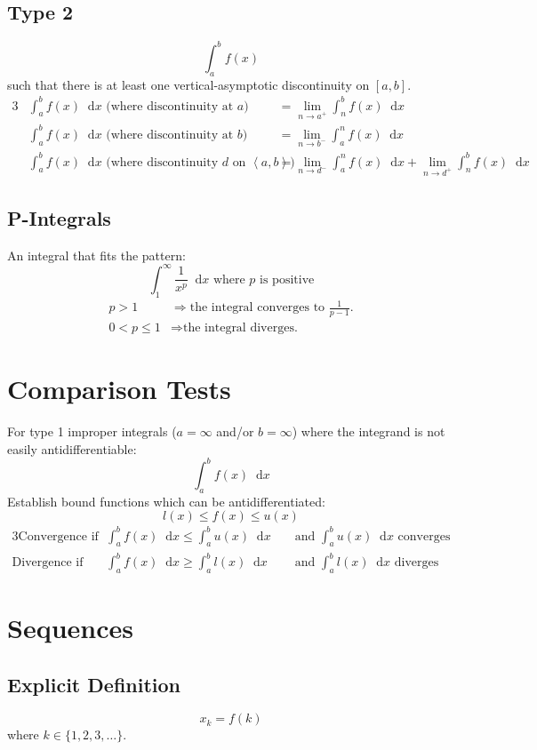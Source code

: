 \documentclass[12pt]{article}
\renewcommand*{\implies}{\Rightarrow}
\newcommand*{\rmaskip}{\setlength{\abovedisplayskip}{0pt}}
\newcommand*{\rmbskip}{\setlength{\belowdisplayskip}{0pt}}
\newcommand*{\rmskip}{\rmaskip \rmbskip}
\newcommand*{\D}[1]{\mathop{}\!\mathrm{d} #1}
\begin{document}
\subsection*{Type 2}
\[
  \int_a^b f(x)
\]
such that there is at least one vertical-asymptotic discontinuity on \([a,b]\).
\begin{alignat*}{3}
  &\int_a^b f(x) \D{x} \text{ (where discontinuity at \(a\)) }
    &&= \lim_{n \to a^+} \int_n^b f(x) \D{x}\\
  &\int_a^b f(x) \D{x} \text{ (where discontinuity at \(b\)) }
    &&= \lim_{n \to b^-} \int_a^n f(x) \D{x}\\
  &\int_a^b f(x) \D{x} \text{ (where discontinuity \(d\) on
    \(\left<a,b\right>\)) } &&= \lim_{n \to d^-} \int_a^n f(x) \D{x} +
    \lim_{n \to d^+} \int_n^b f(x) \D{x}
\end{alignat*}
\subsection*{P-Integrals}
An integral that fits the pattern:
\[
  \int_1^\infty \frac{1}{x^p} \D{x} \text{ where \(p\) is positive}
\]
{\rmaskip\begin{align*}
  p > 1 &\implies \text{the integral converges to \(\tfrac{1}{p-1}\).}\\
  0 < p \le 1 &\implies \text{the integral diverges.}
\end{align*}}%
\section*{Comparison Tests}
For type 1 improper integrals (\(a = \infty\) and\slash or \(b = \infty\))
where the integrand is not easily antidifferentiable:
\[
  \int_a^b f(x) \D{x}
\]
Establish bound functions which can be antidifferentiated:
\[
  l(x) \le f(x) \le u(x)
\]
{\rmskip\begin{alignat*}{3}
  \text{Convergence if } &\int_a^b f(x) \D{x} \le \int_a^b u(x) \D{x}
    &&\text{ and } \int_a^b u(x) \D{x} \text{ converges}\\
  \text{Divergence if } &\int_a^b f(x) \D{x} \ge \int_a^b l(x) \D{x}
    &&\text{ and } \int_a^b l(x) \D{x} \text{ diverges}
\end{alignat*}}%
\section*{Sequences}
\subsection*{Explicit Definition}
\[
  x_k = f(k)
\]
where \(k \in \{1,2,3,\dots\}\).
\end{document}
